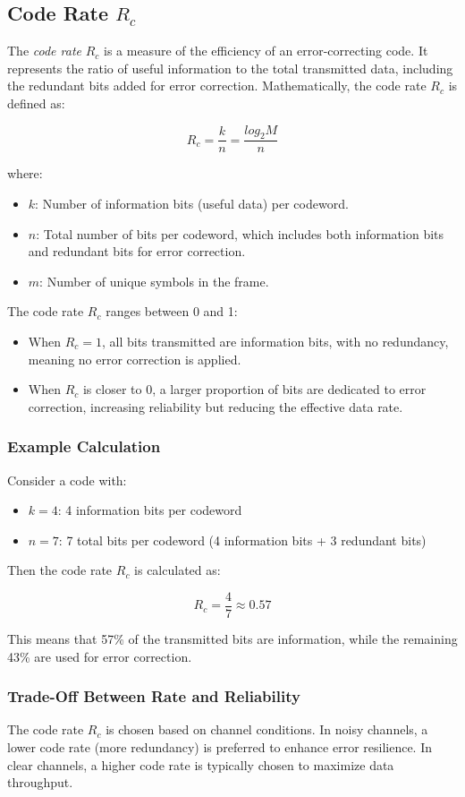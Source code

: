 \documentclass[10pt]{article}
\begin{document}
\subsection{Code Rate \( R_c \)}

The \textit{code rate} \( R_c \) is a measure of the efficiency of an error-correcting code. It represents the ratio of useful information to the total transmitted data, including the redundant bits added for error correction. Mathematically, the code rate \( R_c \) is defined as:

\[
    R_c = \frac{k}{n} = \frac{log_2{M}}{n}
\]

where:
\begin{itemize}
    \item \( k \): Number of information bits (useful data) per codeword.
    \item \( n \): Total number of bits per codeword, which includes both information bits and redundant bits for error correction.
    \item $m$: Number of unique symbols in the frame.
\end{itemize}

\noindent The code rate \( R_c \) ranges between 0 and 1:
\begin{itemize}
    \item When \( R_c = 1 \), all bits transmitted are information bits, with no redundancy, meaning no error correction is applied.
    \item When \( R_c \) is closer to 0, a larger proportion of bits are dedicated to error correction, increasing reliability but reducing the effective data rate.
\end{itemize}

\subsubsection{Example Calculation}

Consider a code with:
\begin{itemize}
    \item \( k = 4 \): 4 information bits per codeword
    \item \( n = 7 \): 7 total bits per codeword (4 information bits + 3 redundant bits)
\end{itemize}

Then the code rate \( R_c \) is calculated as:

\[
R_c = \frac{4}{7} \approx 0.57
\]

This means that 57\% of the transmitted bits are information, while the remaining 43\% are used for error correction.

\subsubsection{Trade-Off Between Rate and Reliability}

The code rate \( R_c \) is chosen based on channel conditions. In noisy channels, a lower code rate (more redundancy) is preferred to enhance error resilience. In clear channels, a higher code rate is typically chosen to maximize data throughput.
\end{document}
